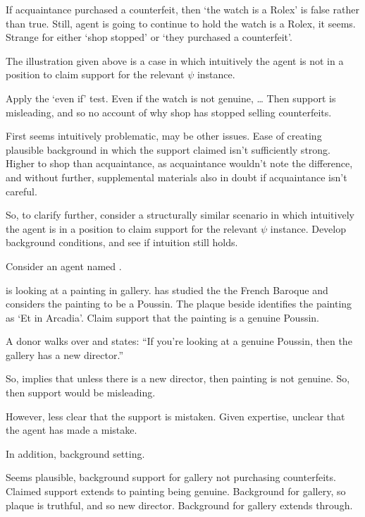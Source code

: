\begin{note}
  If acquaintance purchased a counterfeit, then `the watch is a Rolex' is false rather than true.
  Still, agent is going to continue to hold the watch is a Rolex, it seems.
  Strange for either `shop stopped' or `they purchased a counterfeit'.

  The illustration given above is a case in which intuitively the agent is not in a position to claim support for the relevant \(\psi\) instance.

  Apply the `even if' test.
  Even if the watch is not genuine, \dots
  Then support is misleading, and so no account of why shop has stopped selling counterfeits.
\end{note}

\begin{note}
  First seems intuitively problematic, may be other issues.
  Ease of creating plausible background in which the support claimed isn't sufficiently strong.
  Higher to shop than acquaintance, as acquaintance wouldn't note the difference, and without further, supplemental materials also in doubt if acquaintance isn't careful.

  So, to clarify further, consider a structurally similar scenario in which intuitively the agent is in a position to claim support for the relevant \(\psi\) instance.
  Develop background conditions, and see if intuition still holds.
\end{note}

\begin{note}
  Consider an agent named .

   is looking at a painting in gallery.
   has studied the the French Baroque and considers the painting to be a Poussin.
  The plaque beside identifies the painting as `Et in Arcadia'.
  Claim support that the painting is a genuine Poussin.

  A donor walks over and states:
  ``If you're looking at a genuine Poussin, then the gallery has a new director.''

  So, implies that unless there is a new director, then painting is not genuine.
  So, then support would be misleading.

  However, less clear that the support is mistaken.
  Given expertise, unclear that the agent has made a mistake.

  In addition, background setting.

  Seems plausible, background support for gallery not purchasing counterfeits.
  Claimed support extends to painting being genuine.
  Background for gallery, so plaque is truthful, and so new director.
  Background for gallery extends through.
\end{note}

